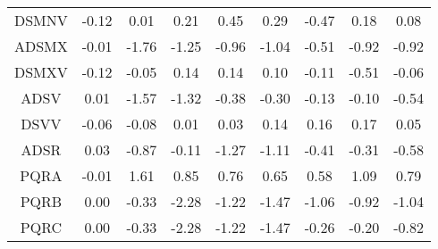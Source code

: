 \documentclass[11pt,a4paper]{report}
\begin{document}
\begin{longtable}{ | c || c | c | c | c | c | c | c || c |}
DSMNV &  \cellcolor[HTML]{FFFFFF} -0.12 &  \cellcolor[HTML]{FFFFFF} 0.01 &  \cellcolor[HTML]{F7F7FF} 0.21 &  \cellcolor[HTML]{F7F7FF} 0.45 &  \cellcolor[HTML]{F7F7FF} 0.29 &  \cellcolor[HTML]{FFF7F7} -0.47 &  \cellcolor[HTML]{F7F7FF} 0.18 &  \cellcolor[HTML]{FFFFFF} 0.08 \\
ADSMX &  \cellcolor[HTML]{FFFFFF} -0.01 &  \cellcolor[HTML]{FFCFCF} -1.76 &  \cellcolor[HTML]{FFDFDF} -1.25 &  \cellcolor[HTML]{FFE7E7} -0.96 &  \cellcolor[HTML]{FFE7E7} -1.04 &  \cellcolor[HTML]{FFEFEF} -0.51 &  \cellcolor[HTML]{FFE7E7} -0.92 &  \cellcolor[HTML]{FFE7E7} -0.92 \\
DSMXV &  \cellcolor[HTML]{FFFFFF} -0.12 &  \cellcolor[HTML]{FFFFFF} -0.05 &  \cellcolor[HTML]{FFFFFF} 0.14 &  \cellcolor[HTML]{FFFFFF} 0.14 &  \cellcolor[HTML]{FFFFFF} 0.10 &  \cellcolor[HTML]{FFFFFF} -0.11 &  \cellcolor[HTML]{FFEFEF} -0.51 &  \cellcolor[HTML]{FFFFFF} -0.06 \\
ADSV &  \cellcolor[HTML]{FFFFFF} 0.01 &  \cellcolor[HTML]{FFD7D7} -1.57 &  \cellcolor[HTML]{FFDFDF} -1.32 &  \cellcolor[HTML]{FFF7F7} -0.38 &  \cellcolor[HTML]{FFF7F7} -0.30 &  \cellcolor[HTML]{FFFFFF} -0.13 &  \cellcolor[HTML]{FFFFFF} -0.10 &  \cellcolor[HTML]{FFEFEF} -0.54 \\
DSVV &  \cellcolor[HTML]{FFFFFF} -0.06 &  \cellcolor[HTML]{FFFFFF} -0.08 &  \cellcolor[HTML]{FFFFFF} 0.01 &  \cellcolor[HTML]{FFFFFF} 0.03 &  \cellcolor[HTML]{FFFFFF} 0.14 &  \cellcolor[HTML]{FFFFFF} 0.16 &  \cellcolor[HTML]{F7F7FF} 0.17 &  \cellcolor[HTML]{FFFFFF} 0.05 \\
ADSR &  \cellcolor[HTML]{FFFFFF} 0.03 &  \cellcolor[HTML]{FFE7E7} -0.87 &  \cellcolor[HTML]{FFFFFF} -0.11 &  \cellcolor[HTML]{FFDFDF} -1.27 &  \cellcolor[HTML]{FFDFDF} -1.11 &  \cellcolor[HTML]{FFF7F7} -0.41 &  \cellcolor[HTML]{FFF7F7} -0.31 &  \cellcolor[HTML]{FFEFEF} -0.58 \\
PQRA &  \cellcolor[HTML]{FFFFFF} -0.01 &  \cellcolor[HTML]{D7D7FF} 1.61 &  \cellcolor[HTML]{E7E7FF} 0.85 &  \cellcolor[HTML]{EFEFFF} 0.76 &  \cellcolor[HTML]{EFEFFF} 0.65 &  \cellcolor[HTML]{EFEFFF} 0.58 &  \cellcolor[HTML]{E7E7FF} 1.09 &  \cellcolor[HTML]{EFEFFF} 0.79 \\
PQRB &  \cellcolor[HTML]{FFFFFF} 0.00 &  \cellcolor[HTML]{FFF7F7} -0.33 &  \cellcolor[HTML]{FFC7C7} -2.28 &  \cellcolor[HTML]{FFDFDF} -1.22 &  \cellcolor[HTML]{FFD7D7} -1.47 &  \cellcolor[HTML]{FFE7E7} -1.06 &  \cellcolor[HTML]{FFE7E7} -0.92 &  \cellcolor[HTML]{FFE7E7} -1.04 \\
PQRC &  \cellcolor[HTML]{FFFFFF} 0.00 &  \cellcolor[HTML]{FFF7F7} -0.33 &  \cellcolor[HTML]{FFC7C7} -2.28 &  \cellcolor[HTML]{FFDFDF} -1.22 &  \cellcolor[HTML]{FFD7D7} -1.47 &  \cellcolor[HTML]{FFF7F7} -0.26 &  \cellcolor[HTML]{FFF7F7} -0.20 &  \cellcolor[HTML]{FFE7E7} -0.82 \\

\end{longtable}
\end{document}
